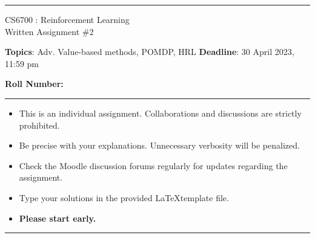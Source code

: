 \documentclass[addpoints,12pt,solution]{exam}
\begin{document}
\hrule
\vspace{1mm}
\noindent 
\begin{center}
{\Large CS6700 : Reinforcement Learning} \\
{\large Written Assignment \#2}
\end{center}
\vspace{1mm}
\noindent 
\footnotesize{{\textbf{Topics}: Adv. Value-based methods, POMDP, HRL} \hfill \textbf{Deadline}: 30 April 2023, 11:59 pm


  \hfill {\bf Roll Number:} }
\vspace{2mm}
\hrule

{\small

\begin{itemize}\itemsep0mm
\item This is an individual assignment. Collaborations and discussions are strictly
prohibited.
\item Be precise with your explanations. Unnecessary verbosity will be penalized.
\item Check the Moodle discussion forums regularly for updates regarding the assignment.
\item Type your solutions in the provided \LaTeX template file.
\item \textbf{Please start early.}
\end{itemize}
}

\hrule

\vspace{3mm}




\end{document}
